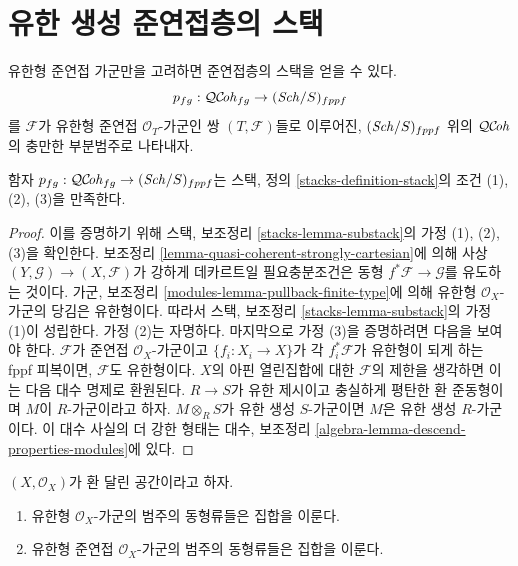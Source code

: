 \section{유한 생성 준연접층의 스택}
\label{section-stack-of-finitely-generated-quasi-coherent-sheaves}

\noindent
유한형 준연접 가군만을 고려하면 준연접층의 스택을 얻을 수 있다.
$$
p_{fg} : \mathcal{QC}\!\mathit{oh}_{fg} \to (\mathit{Sch}/S)_{fppf}
$$
를 $\mathcal{F}$가 유한형 준연접 $\mathcal{O}_T$-가군인 쌍
$(T, \mathcal{F})$들로 이루어진, $(\mathit{Sch}/S)_{fppf}$ 위의 $\mathcal{QC}\!\mathit{oh}$의
충만한 부분범주로 나타내자.

\begin{lemma}
\label{lemma-stack-of-finite-type-quasi-coherent-sheaves}
함자 $p_{fg} : \mathcal{QC}\!\mathit{oh}_{fg} \to (\mathit{Sch}/S)_{fppf}$는 스택, 정의
\ref{stacks-definition-stack}의 조건 (1), (2), (3)을 만족한다.
\end{lemma}

\begin{proof}
이를 증명하기 위해 스택, 보조정리 \ref{stacks-lemma-substack}의 가정
(1), (2), (3)을 확인한다. 보조정리
\ref{lemma-quasi-coherent-strongly-cartesian}에 의해 사상
$(Y, \mathcal{G}) \to (X, \mathcal{F})$가 강하게 데카르트일 필요충분조건은
동형 $f^*\mathcal{F} \to \mathcal{G}$를 유도하는 것이다. 가군,
보조정리 \ref{modules-lemma-pullback-finite-type}에 의해 유한형
$\mathcal{O}_X$-가군의 당김은 유한형이다. 따라서 스택, 보조정리
\ref{stacks-lemma-substack}의 가정 (1)이 성립한다. 가정 (2)는 자명하다.
마지막으로 가정 (3)을 증명하려면 다음을 보여야 한다. $\mathcal{F}$가
준연접 $\mathcal{O}_X$-가군이고 $\{f_i : X_i \to X\}$가 각
$f_i^*\mathcal{F}$가 유한형이 되게 하는 fppf 피복이면,
$\mathcal{F}$도 유한형이다. $X$의 아핀 열린집합에 대한 $\mathcal{F}$의
제한을 생각하면 이는 다음 대수 명제로 환원된다. $R \to S$가 유한
제시이고 충실하게 평탄한 환 준동형이며 $M$이 $R$-가군이라고 하자.
$M \otimes_R S$가 유한 생성 $S$-가군이면 $M$은 유한 생성
$R$-가군이다. 이 대수 사실의 더 강한 형태는 대수, 보조정리
\ref{algebra-lemma-descend-properties-modules}에 있다.
\end{proof}

\begin{lemma}
\label{lemma-finite-type}
$(X, \mathcal{O}_X)$가 환 달린 공간이라고 하자.
\begin{enumerate}
\item 유한형 $\mathcal{O}_X$-가군의 범주의 동형류들은 집합을 이룬다.
\item 유한형 준연접 $\mathcal{O}_X$-가군의 범주의 동형류들은 집합을
이룬다.
\end{enumerate}
\end{lemma}

